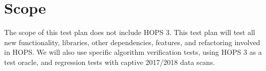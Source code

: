 \documentclass[notitlepage,letterpaper,pdftex,12pt,final]{article}
\numberwithin{equation}{section}
\begin{document}
\section{Scope}
\label{sec:scope}
The scope of this test plan does not include \ac{HOPS} 3. This test plan will test
all new functionality, libraries, other dependencies, features, and refactoring involved in
\ac{HOPS}. We will also use specific algorithm verification tests, using \ac{HOPS} 3 as a test
oracle, and regression tests with captive 2017/2018 data scans.

\pagebreak



\pagebreak


\pagebreak


\pagebreak


\pagebreak


\pagebreak


\pagebreak


\addtocounter{section}{1}
\renewcommand{\refname}{\thesection. References}
\printbibliography
\label{sec:references}


\label{page:LastPage}
\end{document}
